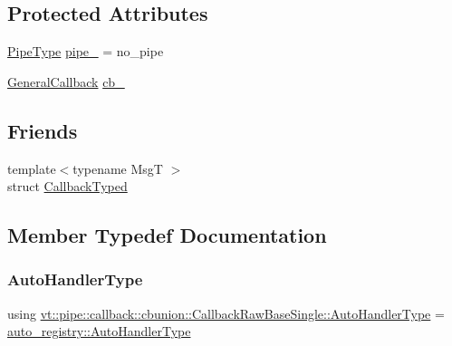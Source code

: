 \subsection*{Protected Attributes}
\begin{DoxyCompactItemize}
\item 
\hyperlink{namespacevt_ac9852acda74d1896f48f406cd72c7bd3}{Pipe\+Type} \hyperlink{structvt_1_1pipe_1_1callback_1_1cbunion_1_1_callback_raw_base_single_a7cff39d219279b2075d7db56e6b87944}{pipe\+\_\+} = no\+\_\+pipe
\item 
\hyperlink{structvt_1_1pipe_1_1callback_1_1cbunion_1_1_general_callback}{General\+Callback} \hyperlink{structvt_1_1pipe_1_1callback_1_1cbunion_1_1_callback_raw_base_single_a6535ef3d7baf0130dcf2c23f63496f3d}{cb\+\_\+}
\end{DoxyCompactItemize}
\subsection*{Friends}
\begin{DoxyCompactItemize}
\item 
{\footnotesize template$<$typename MsgT $>$ }\\struct \hyperlink{structvt_1_1pipe_1_1callback_1_1cbunion_1_1_callback_raw_base_single_a983194428523f2cd409417e221cc51c3}{Callback\+Typed}
\end{DoxyCompactItemize}


\subsection{Member Typedef Documentation}
\mbox{\label{structvt_1_1pipe_1_1callback_1_1cbunion_1_1_callback_raw_base_single_a734a9c83099de5bc1cd85f9da8dba7bb}} 
\subsubsection{\texorpdfstring{Auto\+Handler\+Type}{AutoHandlerType}}
{\footnotesize\ttfamily using \hyperlink{structvt_1_1pipe_1_1callback_1_1cbunion_1_1_callback_raw_base_single_a734a9c83099de5bc1cd85f9da8dba7bb}{vt\+::pipe\+::callback\+::cbunion\+::\+Callback\+Raw\+Base\+Single\+::\+Auto\+Handler\+Type} =  \hyperlink{namespacevt_1_1auto__registry_ae295e18699146815bb7d7674594d95d7}{auto\+\_\+registry\+::\+Auto\+Handler\+Type}}



